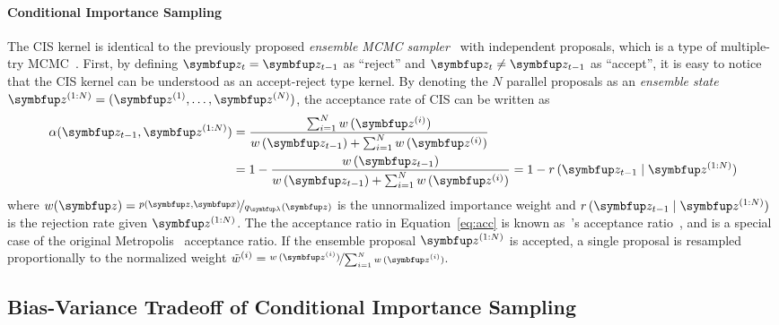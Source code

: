 \paragraph{Conditional Importance Sampling}
The CIS kernel is identical to the previously proposed \textit{ensemble MCMC sampler}~\citep{neal_mcmc_2011a, austad_parallel_2007} with independent proposals, which is a type of multiple-try MCMC~\citep{martino_review_2018}.
First, by defining \(\vz_t = \vz_{t-1}\) as ``reject'' and \(\vz_t \neq \vz_{t-1}\) as ``accept'', it is easy to notice that the CIS kernel can be understood as an accept-reject type kernel.
By denoting the \(N\) parallel proposals as an \textit{ensemble state} \(\vz^{(1:N)} = (\vz^{(1)}, \ldots, \vz^{(N)})\), the acceptance rate of CIS can be written as
\begin{align}
  \alpha(\vz_{t-1}, \vz^{(1:N)})
  &= \frac{\sum^{N}_{i=1} w\,(\vz^{(i)})}{w\,(\vz_{t-1}) + \sum^{N}_{i=1} w\,(\vz^{(i)})} \nonumber \\
  &= 1 - \frac{w\,(\vz_{t-1})}{w\,(\vz_{t-1}) + \sum^{N}_{i=1} w\,(\vz^{(i)})}
  = 1 - r\,(\vz_{t-1}\mid\vz^{(1:N)})\label{eq:acc}
\end{align}
where \(w(\vz) = \nicefrac{p(\vz,\vx)}{q_{\vlambda}(\vz)}\) is the unnormalized importance weight and \(r\,(\vz_{t-1}\mid \vz^{(1:N)})\) is the rejection rate given \(\vz^{(1:N)}\).
The the acceptance ratio in Equation~\eqref{eq:acc} is known as~\citeauthor{barker_monte_1965}'s acceptance ratio~\citep{barker_monte_1965}, and is a special case of the original Metropolis~\cite{metropolis_equation_1953} acceptance ratio.
If the ensemble proposal \(\vz^{(1:N)}\) is accepted, a single proposal is resampled proportionally to the normalized weight \(\tilde{w}^{(i)} = \nicefrac{w\,(\vz^{(i)})}{\sum_{i=1}^N w\,(\vz^{(i)}) }\).


\subsection{Bias-Variance Tradeoff of Conditional Importance Sampling}
